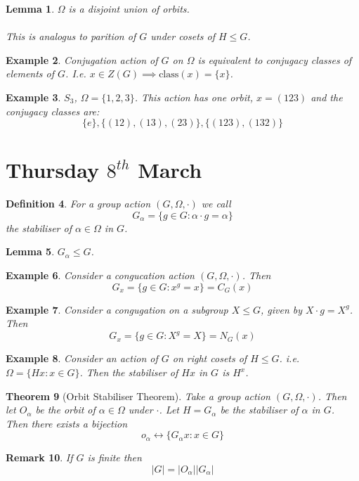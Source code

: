 \documentclass[a4paper,10pt]{article}
\newtheorem{thm}{Theorem}
\newtheorem{Def}[thm]{Definition}
\newtheorem{eg}[thm]{Example}
\newtheorem{Lem}[thm]{Lemma}
\newtheorem{rem}[thm]{Remark}
\begin{document}
\begin{Lem}
$\Omega$ is a disjoint union of orbits. \\
\\
This is analogus to parition of $G$ under cosets of $H \leq G$.
\end{Lem}

\begin{eg}
Conjugation action of $G$ on $\Omega$ is equivalent to conjugacy classes of elements of $G$. I.e. $x \in Z(G) \implies \text{class}(x) = \{x\}$.
\end{eg}

\begin{eg}
$S_3$, $\Omega = \{1,2,3\}$. This action has one orbit, $x = (123)$ and the conjugacy classes are:
\[ \{ e\}, \{ (12),(13),(23) \}, \{ (123),(132) \} \]
\end{eg}

\newpage
\section{Thursday $8^{th}$ March}


\begin{Def}
For a group action $(G , \Omega, \cdot)$ we call
\[ G_\alpha = \{ g \in G : \alpha \cdot g = \alpha \} \]
the stabiliser of $\alpha \in \Omega$ in $G$. 
\end{Def}

\begin{Lem}
$G_\alpha \leq G$. 
\end{Lem}

\begin{eg}
Consider a congucation action $(G, \Omega, \cdot)$. Then 
\[ G_x = \{ g \in G : x^g = x \} = C_G(x) \]
\end{eg}

\begin{eg}
Consider a congugation on a subgroup $X \leq G$, given by $X \cdot g = X^g$. Then
\[ G_x = \{ g \in G : X^g = X \} = N_G(x) \]
\end{eg}

\begin{eg}
Consider an action of $G$ on right cosets of $H \leq G$. i.e. $\Omega = \{ Hx : x \in G\}$. Then the stabiliser of $Hx$ in $G$ is $H^x$. 
\end{eg}


\begin{thm}[Orbit Stabiliser Theorem]
Take a group action $(G, \Omega, \cdot)$. Then let $O_\alpha$ be the orbit of $\alpha \in \Omega$ under $\cdot$. Let $H = G_\alpha$ be the stabiliser of $\alpha$ in $G$. Then there exists a bijection
\[ o_\alpha \leftrightarrow \{ G_\alpha x : x \in G \} \] 
\end{thm}
\begin{rem}
If $G$ is finite then 
\[ |G| = |O_\alpha| | G_\alpha| \]
\end{rem}
\end{document}
